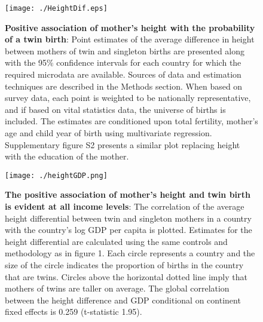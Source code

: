 \documentclass[11pt]{article}
\begin{document}
\begin{spacing}{1}
\begin{figure}[htpb!]
  \texttt{[image: ./HeightDif.eps]}
\vspace{5mm}
\caption{\textbf{Positive association of mother's height with the probability of a twin birth}: {\footnotesize Point estimates of the average difference in height between mothers of twin and singleton births are presented along with the 95\% confidence intervals for each country for which the required microdata are available. Sources of data and estimation techniques are described in the Methods section. When based on survey data, each point is weighted to be nationally representative, and if based on vital statistics data, the universe of births is included. The estimates are conditioned upon total fertility, mother's age and child year of birth using multivariate regression. Supplementary figure S2 presents a similar plot replacing height with the education of the mother.}}
\label{fig:countryEsts}
\end{figure}


\begin{figure}[htpb!]
  \texttt{[image: ./heightGDP.png]}
\vspace{5mm}
\caption{\textbf{The positive association of mother's height and twin birth is evident at all income levels}: {\footnotesize The correlation of the average height differential between twin and singleton mothers in a country with the country's log GDP per capita is plotted.  Estimates for the height differential are calculated using the same controls and methodology as in figure 1.
Each circle represents a country and the size of the circle indicates the proportion of births in the country that are twins. Circles above the horizontal dotted line imply that mothers of twins are taller on average. The global correlation between the height difference and GDP conditional on continent fixed effects is 0.259 (t-statistic 1.95).}} %
\label{fig:GDPEsts}
\end{figure}


\end{spacing}
\end{document}
